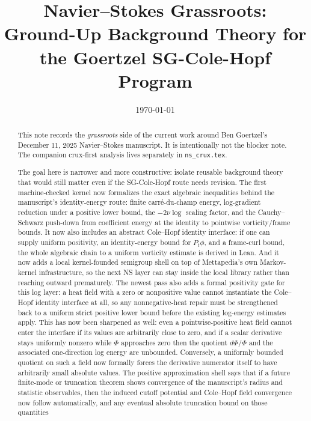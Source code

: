 \documentclass[11pt]{article}
\title{Navier--Stokes Grassroots:\\
Ground-Up Background Theory for the Goertzel SG-Cole-Hopf Program}
\author{}
\date{\today}
\theoremstyle{remark}
\begin{document}
\maketitle

\begin{abstract}
This note records the \emph{grassroots} side of the current work around Ben
Goertzel's December 11, 2025 Navier--Stokes manuscript.  It is intentionally
not the blocker note.  The companion crux-first analysis lives separately in
\texttt{ns\_crux.tex}.

The goal here is narrower and more constructive: isolate reusable background
theory that would still matter even if the SG-Cole-Hopf route needs revision.
The first machine-checked kernel now formalizes the exact algebraic inequalities
behind the manuscript's identity-energy route: finite carré-du-champ energy,
log-gradient reduction under a positive lower bound, the \(-2\nu \log\) scaling
factor, and the Cauchy--Schwarz push-down from coefficient energy at the
identity to pointwise vorticity/frame bounds.  It now also includes an abstract
Cole--Hopf identity interface: if one can supply uniform positivity, an
identity-energy bound for \(P_t\phi\), and a frame-curl bound, the whole
algebraic chain to a uniform vorticity estimate is derived in Lean.  And it now
adds a local kernel-founded semigroup shell on top of Mettapedia's own
Markov-kernel infrastructure, so the next NS layer can stay inside the local
library rather than reaching outward prematurely.  The newest pass also adds a
formal positivity gate for this log layer: a heat field with a zero or
nonpositive value cannot instantiate the Cole--Hopf identity interface at all,
so any nonnegative-heat repair must be strengthened back to a uniform strict
positive lower bound before the existing log-energy estimates apply.  This has
now been sharpened as well: even a pointwise-positive heat field cannot enter
the interface if its values are arbitrarily close to zero, and if a scalar
derivative stays uniformly nonzero while \(\Phi\) approaches zero then the
quotient \(d\Phi/\Phi\) and the associated one-direction log energy are
unbounded.  Conversely, a uniformly bounded quotient on such a field now
formally forces the derivative numerator itself to have arbitrarily small
absolute values.  The positive
approximation shell says that if a future finite-mode or truncation theorem
shows convergence of the manuscript's radius and statistic observables, then
the induced cutoff potential and Cole--Hopf field convergence now follow
automatically, and any eventual absolute truncation bound on those quantities

\end{abstract}
\end{document}
